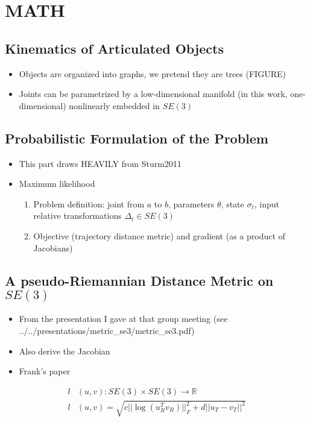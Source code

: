 \documentclass[letterpaper, 10 pt, conference]{ieeeconf}  %
\begin{document}
\section{MATH}

\subsection{Kinematics of Articulated Objects}
    \begin{itemize}
      \item Objects are organized into graphs, we pretend they are trees (FIGURE)
      \item Joints can be parametrized by a low-dimensional manifold (in this work, one-dimensional) nonlinearly embedded in $SE(3)$
    \end{itemize}
\subsection{Probabilistic Formulation of the Problem}
    \begin{itemize}
      \item This part draws HEAVILY from Sturm2011
      \item Maximum likelihood
        \begin{enumerate}
          \item Problem definition: joint from $a$ to $b$, parameters $\theta$, state $\sigma_t$, input relative transformations $\Delta_t \in SE(3)$
          \item Objective (trajectory distance metric) and gradient (as a product of Jacobians)
        \end{enumerate}
    \end{itemize}
\subsection{A pseudo-Riemannian Distance Metric on $SE(3)$}
    \begin{itemize}
      \item From the presentation I gave at that group meeting (see ../../presentations/metric\_se3/metric\_se3.pdf)
      \item Also derive the Jacobian
      \item Frank's paper \cite{Park1995}
    \end{itemize}
    \begin{align}
      l&(u,v) : SE(3) \times SE(3) \longrightarrow \mathbb{R} \\
      l&(u,v) = \sqrt{c ||\log(u_R^T v_R)||_F^2 + d ||u_T - v_T||^2} \nonumber
    \end{align}
\end{document}
